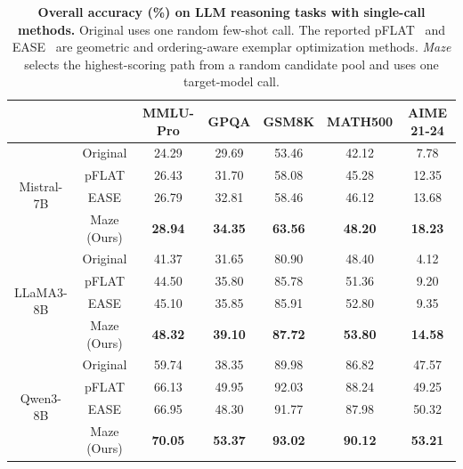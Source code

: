 \begin{table}
\caption{
{\bf Overall accuracy (\%) on LLM reasoning tasks with single-call methods.}
Original uses one random few-shot call.
The reported pFLAT~\citep{shen-etal-2023-flatness} and EASE~\citep{wu2024prompt} are geometric and ordering-aware exemplar optimization methods.
\emph{Maze} selects the highest-scoring path from a random candidate pool and uses one target-model call.
}
\label{tab:single_call_results}
\centering
\small
\begin{tabular}{@{}ccccccc@{}}
\toprule
 &  & MMLU-Pro & GPQA & GSM8K & MATH500 & AIME 21-24\\ \midrule
\multirow{4}{*}{Mistral-7B} & Original & 24.29 & 29.69 & 53.46 & 42.12 & 7.78\\
 & pFLAT & 26.43 & 31.70 & 58.08 & 45.28 & 12.35\\
 & EASE & 26.79 & 32.81 & 58.46 & 46.12 & 13.68\\
 & Maze (Ours) & {\bf 28.94} & {\bf 34.35} & {\bf 63.56} & {\bf 48.20} & {\bf 18.23}\\\midrule
\multirow{4}{*}{LLaMA3-8B} & Original & 41.37 & 31.65 & 80.90 & 48.40 & 4.12\\
 & pFLAT & 44.50 & 35.80 & 85.78 & 51.36 & 9.20\\
 & EASE & 45.10 & 35.85 & 85.91 & 52.80 & 9.35\\
 & Maze (Ours) & {\bf 48.32} & {\bf 39.10} & {\bf 87.72} & {\bf 53.80} & {\bf 14.58}\\ \midrule
\multirow{4}{*}{Qwen3-8B} & Original & 59.74 & 38.35 & 89.98 & 86.82 & 47.57\\
 & pFLAT & 66.13 & 49.95 & 92.03 & 88.24 & 49.25\\
 & EASE & 66.95 & 48.30 & 91.77 & 87.98 & 50.32\\
 & Maze (Ours) & {\bf 70.05} & {\bf 53.37} & {\bf 93.02} & {\bf 90.12} & {\bf 53.21}\\ \bottomrule
\end{tabular}

\end{table}

